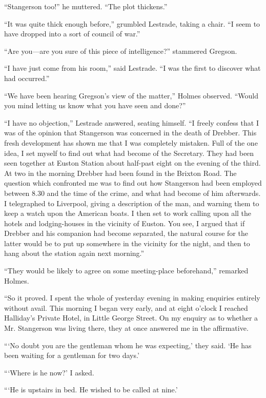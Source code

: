 \documentclass[12pt]{book}
\begin{document}
“Stangerson too!” he muttered. “The plot thickens.” 

“It was quite thick enough before,” grumbled Lestrade, taking a chair. “I seem to have dropped into a sort of council of war.” 

“Are you—are you sure of this piece of intelligence?” stammered Gregson. 

“I have just come from his room,” said Lestrade. “I was the first to discover what had occurred.” 

“We have been hearing Gregson’s view of the matter,” Holmes observed. “Would you mind letting us know what you have seen and done?” 

“I have no objection,” Lestrade answered, seating himself. “I freely confess that I was of the opinion that Stangerson was concerned in the death of Drebber. This fresh development has shown me that I was completely mistaken. Full of the one idea, I set myself to find out what had become of the Secretary. They had been seen together at Euston Station about half-past eight on the evening of the third. At two in the morning Drebber had been found in the Brixton Road. The question which confronted me was to find out how Stangerson had been employed between 8.30 and the time of the crime, and what had become of him afterwards. I telegraphed to Liverpool, giving a description of the man, and warning them to keep a watch upon the American boats. I then set to work calling upon all the hotels and lodging-houses in the vicinity of Euston. You see, I argued that if Drebber and his companion had become separated, the natural course for the latter would be to put up somewhere in the vicinity for the night, and then to hang about the station again next morning.” 

“They would be likely to agree on some meeting-place beforehand,” remarked Holmes. 

“So it proved. I spent the whole of yesterday evening in making enquiries entirely without avail. This morning I began very early, and at eight o’clock I reached Halliday’s Private Hotel, in Little George Street. On my enquiry as to whether a Mr. Stangerson was living there, they at once answered me in the affirmative. 

“‘No doubt you are the gentleman whom he was expecting,’ they said. ‘He has been waiting for a gentleman for two days.’ 

“‘Where is he now?’ I asked. 

“‘He is upstairs in bed. He wished to be called at nine.’ 
\end{document}

